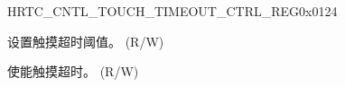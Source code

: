 \begin{register}{H}{RTC\_CNTL\_TOUCH\_TIMEOUT\_CTRL\_REG}{0x{}0124}\label{regdesc:RTCCNTLRTCTOUCHTIMEOUTCTRLREG}
%
%
%
\regnewline%
\begin{regdesc}\begin{reglist}
\label{fielddesc:RTCCNTLTOUCHTIMEOUTNUM}\item [RTC\_CNTL\_TOUCH\_TIMEOUT\_NUM] 设置触摸超时阈值。 (R/W)
\label{fielddesc:RTCCNTLTOUCHTIMEOUTEN}\item [RTC\_CNTL\_TOUCH\_TIMEOUT\_EN] 使能触摸超时。 (R/W)
\end{reglist}\end{regdesc}
\end{register}

